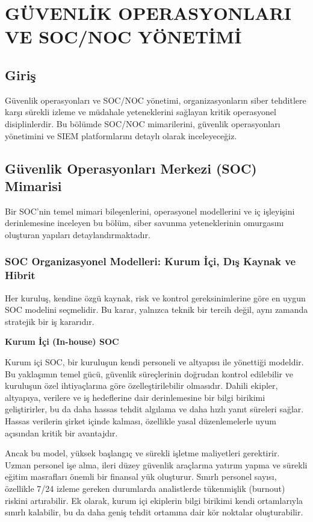 \chapter{GÜVENLİK OPERASYONLARI VE SOC/NOC YÖNETİMİ}

\section*{Giriş}
Güvenlik operasyonları ve SOC/NOC yönetimi, organizasyonların siber tehditlere karşı sürekli izleme ve müdahale yeteneklerini sağlayan kritik operasyonel disiplinlerdir. Bu bölümde SOC/NOC mimarilerini, güvenlik operasyonları yönetimini ve SIEM platformlarını detaylı olarak inceleyeceğiz.

\section{Güvenlik Operasyonları Merkezi (SOC) Mimarisi}

Bir SOC'nin temel mimari bileşenlerini, operasyonel modellerini ve iç işleyişini derinlemesine inceleyen bu bölüm, siber savunma yeteneklerinin omurgasını oluşturan yapıları detaylandırmaktadır.

\subsection{SOC Organizasyonel Modelleri: Kurum İçi, Dış Kaynak ve Hibrit}

Her kuruluş, kendine özgü kaynak, risk ve kontrol gereksinimlerine göre en uygun SOC modelini seçmelidir. Bu karar, yalnızca teknik bir tercih değil, aynı zamanda stratejik bir iş kararıdır.

\textbf{Kurum İçi (In-house) SOC}

Kurum içi SOC, bir kuruluşun kendi personeli ve altyapısı ile yönettiği modeldir. Bu yaklaşımın temel gücü, güvenlik süreçlerinin doğrudan kontrol edilebilir ve kuruluşun özel ihtiyaçlarına göre özelleştirilebilir olmasıdır. Dahili ekipler, altyapıya, verilere ve iş hedeflerine dair derinlemesine bir bilgi birikimi geliştirirler, bu da daha hassas tehdit algılama ve daha hızlı yanıt süreleri sağlar. Hassas verilerin şirket içinde kalması, özellikle yasal düzenlemelerle uyum açısından kritik bir avantajdır.

Ancak bu model, yüksek başlangıç ve sürekli işletme maliyetleri gerektirir. Uzman personel işe alma, ileri düzey güvenlik araçlarına yatırım yapma ve sürekli eğitim masrafları önemli bir finansal yük oluşturur. Sınırlı personel sayısı, özellikle 7/24 izleme gereken durumlarda analistlerde tükenmişlik (burnout) riskini artırabilir. Ek olarak, kurum içi ekiplerin bilgi birikimi kendi ortamlarıyla sınırlı kalabilir, bu da daha geniş tehdit ortamına dair kör noktalar oluşturabilir.

